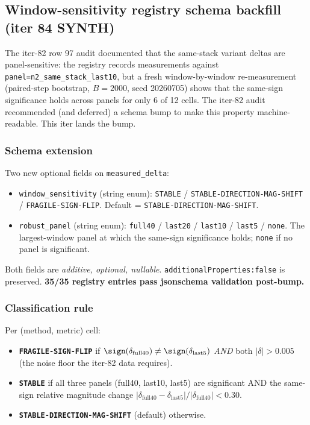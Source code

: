 \subsection{Window-sensitivity registry schema backfill (iter 84 SYNTH)}
\label{sec:p6-window-sensitivity-backfill}

The iter-82 row 97 audit documented that the same-stack variant deltas
are panel-sensitive: the registry records measurements against
\verb|panel=n2_same_stack_last10|, but a fresh window-by-window
re-measurement (paired-step bootstrap, $B=2000$, seed 20260705) shows
that the same-sign significance holds across panels for only 6 of 12
cells. The iter-82 audit recommended (and deferred) a schema bump to
make this property machine-readable. This iter lands the bump.

\subsubsection{Schema extension}
Two new optional fields on \verb|measured_delta|:
\begin{itemize}
\item \texttt{window\_sensitivity} (string enum):
      \texttt{STABLE} / \texttt{STABLE-DIRECTION-MAG-SHIFT} /
      \texttt{FRAGILE-SIGN-FLIP}.  Default =
      \texttt{STABLE-DIRECTION-MAG-SHIFT}.
\item \texttt{robust\_panel} (string enum):
      \texttt{full40} / \texttt{last20} / \texttt{last10} / \texttt{last5} /
      \texttt{none}. The largest-window panel at which the same-sign
      significance holds; \texttt{none} if no panel is significant.
\end{itemize}
Both fields are \emph{additive, optional, nullable}.
\texttt{additionalProperties:false} is preserved. \textbf{35/35 registry
entries pass jsonschema validation post-bump.}

\subsubsection{Classification rule}
Per (method, metric) cell:
\begin{itemize}
\item \textbf{\texttt{FRAGILE-SIGN-FLIP}} if $\sign(\delta_{\mathrm{full40}})
      \neq \sign(\delta_{\mathrm{last5}})$ \emph{AND} both $|\delta| > 0.005$
      (the noise floor the iter-82 data requires).
\item \textbf{\texttt{STABLE}} if all three panels (full40, last10, last5)
      are significant AND the same-sign relative magnitude change
      $|\delta_{\mathrm{full40}} - \delta_{\mathrm{last5}}| /
      |\delta_{\mathrm{full40}}| < 0.30$.
\item \textbf{\texttt{STABLE-DIRECTION-MAG-SHIFT}} (default) otherwise.
\end{itemize}

